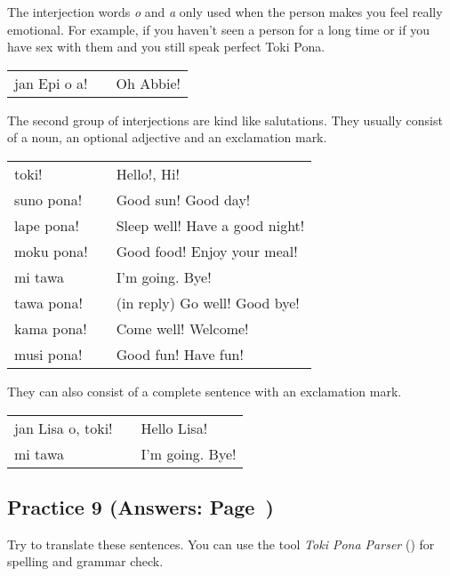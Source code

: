 The interjection words \textit{o} and \textit{a} only used when the person makes you feel really emotional. 
For example, if you haven't seen a person for a long time or if you have sex with them and you still speak perfect Toki Pona. 

\begin{supertabular}{p{5,5cm}|ll}
jan Epi o a! && Oh Abbie! \\
\end{supertabular} 

%
The second group of interjections are kind like salutations.
They usually consist of a noun, an optional adjective and an exclamation mark. 

\begin{supertabular}{p{5,5cm}|ll}
toki! && Hello!, Hi! \\
suno pona! && Good sun! Good day! \\
lape pona! && Sleep well! Have a good night! \\
moku pona! && Good food! Enjoy your meal! \\
mi tawa && I'm going. Bye! \\
tawa pona! && (in reply) Go well! Good bye! \\
kama pona! && Come well! Welcome! \\
musi pona! && Good fun! Have fun! \\
\end{supertabular}  

They can also consist of a complete sentence with an exclamation mark.

\begin{supertabular}{p{5,5cm}|ll}
jan Lisa o, toki! && Hello Lisa! \\
mi tawa && I'm going. Bye! \\
\end{supertabular}
%
\newpage
\subsection*{Practice 9 (Answers: Page~\pageref{'gender_unofficial_words_etc'})}
%
Try to translate these sentences. 
You can use the tool \textit{Toki Pona Parser} (\cite{www:rowa:02}) for spelling and grammar check. 

